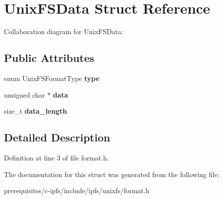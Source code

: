 \hypertarget{struct_unix_f_s_data}{}\section{Unix\+F\+S\+Data Struct Reference}
\label{struct_unix_f_s_data}


Collaboration diagram for Unix\+F\+S\+Data\+:
\subsection*{Public Attributes}
\begin{DoxyCompactItemize}
\item 
\mbox{\label{struct_unix_f_s_data_a0722e53a9018379afbcf67bdaa897cab}} 
enum Unix\+F\+S\+Format\+Type {\bfseries type}
\item 
\mbox{\label{struct_unix_f_s_data_a3d884690e4b886ea9fb6ff7ba9e504e0}} 
unsigned char $\ast$ {\bfseries data}
\item 
\mbox{\label{struct_unix_f_s_data_a686fd5e9c883766a170b3ffbf8348edd}} 
size\+\_\+t {\bfseries data\+\_\+length}
\end{DoxyCompactItemize}


\subsection{Detailed Description}


Definition at line 3 of file format.\+h.



The documentation for this struct was generated from the following file\+:\begin{DoxyCompactItemize}
\item 
prerequisites/c-\/ipfs/include/ipfs/unixfs/format.\+h\end{DoxyCompactItemize}
